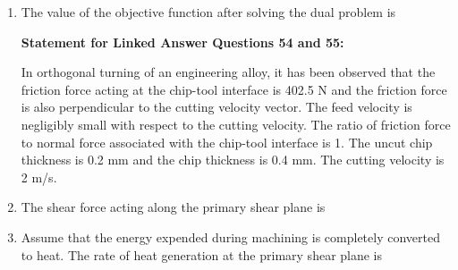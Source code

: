 \documentclass[journal,12pt,onecolumn]{IEEEtran}
\theoremstyle{remark}
\begin{document}
\begin{enumerate}
\item The value of the objective function after solving the dual problem is
\hfill{}
\begin{enumerate}
\end{enumerate}
\noindent 
\textbf{Statement for Linked Answer Questions 54 and 55:}

\vspace{1em} %

\noindent 
In orthogonal turning of an engineering alloy, it has been observed that the friction force acting at the chip-tool interface is 402.5 N and the friction force is also perpendicular to the cutting velocity vector. The feed velocity is negligibly small with respect to the cutting velocity. The ratio of friction force to normal force associated with the chip-tool interface is 1. The uncut chip thickness is 0.2 mm and the chip thickness is 0.4 mm. The cutting velocity is 2 m/s.

\item The shear force  acting along the primary shear plane is
\hfill{}
\begin{enumerate}
\end{enumerate}

\item Assume that the energy expended during machining is completely converted to heat. The rate of heat generation  at the primary shear plane is
\hfill{}
\begin{enumerate}
\end{enumerate}


\end{enumerate}
\end{document}
